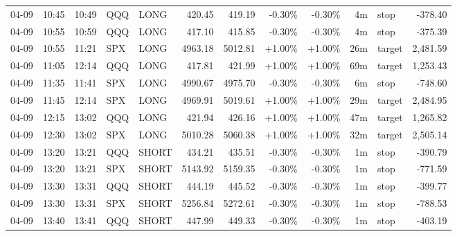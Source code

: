 \documentclass[11pt,a4paper,twoside]{article}
\begin{document}
\begin{center}
\begin{longtable}{>{\color{txtmain}}l l l l l r r r r r >{\color{txtmain}}l r}
04-09 & 10:45 & 10:49 & QQQ & LONG & 420.45 & 419.19 & \textcolor{lossred}{-0.30\%} & \textcolor{lossred}{-0.30\%} & 4m & stop & \textcolor{lossred}{-378.40} \\
04-09 & 10:55 & 10:59 & QQQ & LONG & 417.10 & 415.85 & \textcolor{lossred}{-0.30\%} & \textcolor{lossred}{-0.30\%} & 4m & stop & \textcolor{lossred}{-375.39} \\
04-09 & 10:55 & 11:21 & SPX & LONG & 4963.18 & 5012.81 & \textcolor{wingreen}{+1.00\%} & \textcolor{wingreen}{+1.00\%} & 26m & target & \textcolor{wingreen}{2,481.59} \\
04-09 & 11:05 & 12:14 & QQQ & LONG & 417.81 & 421.99 & \textcolor{wingreen}{+1.00\%} & \textcolor{wingreen}{+1.00\%} & 69m & target & \textcolor{wingreen}{1,253.43} \\
04-09 & 11:35 & 11:41 & SPX & LONG & 4990.67 & 4975.70 & \textcolor{lossred}{-0.30\%} & \textcolor{lossred}{-0.30\%} & 6m & stop & \textcolor{lossred}{-748.60} \\
04-09 & 11:45 & 12:14 & SPX & LONG & 4969.91 & 5019.61 & \textcolor{wingreen}{+1.00\%} & \textcolor{wingreen}{+1.00\%} & 29m & target & \textcolor{wingreen}{2,484.95} \\
04-09 & 12:15 & 13:02 & QQQ & LONG & 421.94 & 426.16 & \textcolor{wingreen}{+1.00\%} & \textcolor{wingreen}{+1.00\%} & 47m & target & \textcolor{wingreen}{1,265.82} \\
04-09 & 12:30 & 13:02 & SPX & LONG & 5010.28 & 5060.38 & \textcolor{wingreen}{+1.00\%} & \textcolor{wingreen}{+1.00\%} & 32m & target & \textcolor{wingreen}{2,505.14} \\
04-09 & 13:20 & 13:21 & QQQ & SHORT & 434.21 & 435.51 & \textcolor{lossred}{-0.30\%} & \textcolor{lossred}{-0.30\%} & 1m & stop & \textcolor{lossred}{-390.79} \\
04-09 & 13:20 & 13:21 & SPX & SHORT & 5143.92 & 5159.35 & \textcolor{lossred}{-0.30\%} & \textcolor{lossred}{-0.30\%} & 1m & stop & \textcolor{lossred}{-771.59} \\
04-09 & 13:30 & 13:31 & QQQ & SHORT & 444.19 & 445.52 & \textcolor{lossred}{-0.30\%} & \textcolor{lossred}{-0.30\%} & 1m & stop & \textcolor{lossred}{-399.77} \\
04-09 & 13:30 & 13:31 & SPX & SHORT & 5256.84 & 5272.61 & \textcolor{lossred}{-0.30\%} & \textcolor{lossred}{-0.30\%} & 1m & stop & \textcolor{lossred}{-788.53} \\
04-09 & 13:40 & 13:41 & QQQ & SHORT & 447.99 & 449.33 & \textcolor{lossred}{-0.30\%} & \textcolor{lossred}{-0.30\%} & 1m & stop & \textcolor{lossred}{-403.19} \\

\end{longtable}
\end{center}
\end{document}
